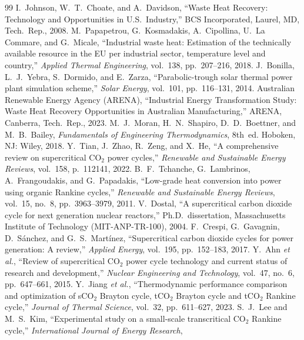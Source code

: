 \documentclass[12pt,a4paper]{report}
\begin{document}
\begin{thebibliography}{99}
I.~Johnson, W.~T.~Choate, and A.~Davidson,
``Waste Heat Recovery: Technology and Opportunities in U.S.\ Industry,''
BCS Incorporated, Laurel, MD, Tech.\ Rep., 2008.
M.~Papapetrou, G.~Kosmadakis, A.~Cipollina, U.~La Commare, and G.~Micale,
``Industrial waste heat: Estimation of the technically available resource in
the EU per industrial sector, temperature level and country,''
\textit{Applied Thermal Engineering}, vol.~138, pp.~207--216, 2018.
J.~Bonilla, L.~J.~Yebra, S.~Dormido, and E.~Zarza,
``Parabolic-trough solar thermal power plant simulation scheme,''
\textit{Solar Energy}, vol.~101, pp.~116--131, 2014.
Australian Renewable Energy Agency (ARENA),
``Industrial Energy Transformation Study: Waste Heat Recovery Opportunities
in Australian Manufacturing,''
ARENA, Canberra, Tech.\ Rep., 2023.
M.~J.~Moran, H.~N.~Shapiro, D.~D.~Boettner, and M.~B.~Bailey,
\textit{Fundamentals of Engineering Thermodynamics}, 8th~ed.
Hoboken, NJ: Wiley, 2018.
Y.~Tian, J.~Zhao, R.~Zeng, and X.~He,
``A comprehensive review on supercritical CO$_2$ power cycles,''
\textit{Renewable and Sustainable Energy Reviews}, vol.~158, p.~112141, 2022.
B.~F.~Tchanche, G.~Lambrinos, A.~Frangoudakis, and G.~Papadakis,
``Low-grade heat conversion into power using organic Rankine cycles,''
\textit{Renewable and Sustainable Energy Reviews},
vol.~15, no.~8, pp.~3963--3979, 2011.
V.~Dostal,
``A supercritical carbon dioxide cycle for next generation nuclear reactors,''
Ph.D.\ dissertation, Massachusetts Institute of Technology
(MIT-ANP-TR-100), 2004.
F.~Crespi, G.~Gavagnin, D.~S{\'a}nchez, and G.~S.~Mart{\'i}nez,
``Supercritical carbon dioxide cycles for power generation: A review,''
\textit{Applied Energy}, vol.~195, pp.~152--183, 2017.
Y.~Ahn \textit{et al.},
``Review of supercritical CO$_2$ power cycle technology and current status
of research and development,''
\textit{Nuclear Engineering and Technology}, vol.~47, no.~6, pp.~647--661, 2015.
Y.~Jiang \textit{et al.},
``Thermodynamic performance comparison and optimization of sCO$_2$ Brayton
cycle, tCO$_2$ Brayton cycle and tCO$_2$ Rankine cycle,''
\textit{Journal of Thermal Science}, vol.~32, pp.~611--627, 2023.
S.~J.~Lee and M.~S.~Kim,
``Experimental study on a small-scale transcritical CO$_2$ Rankine cycle,''
\textit{International Journal of Energy Research},

\end{thebibliography}
\end{document}
